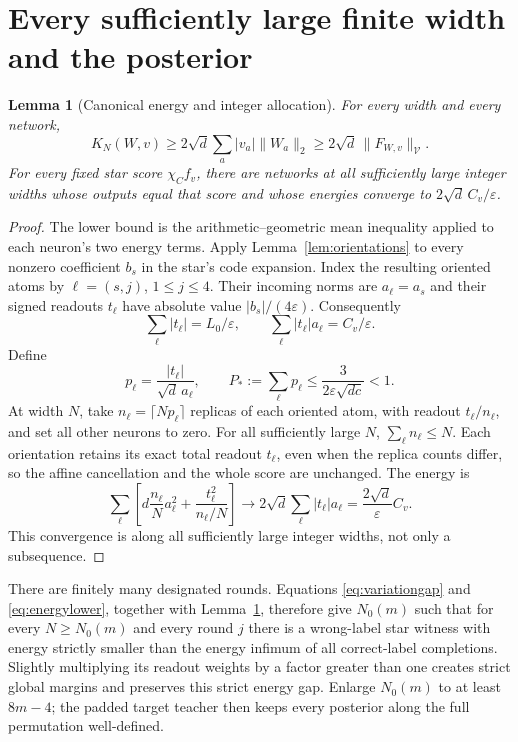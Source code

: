 \documentclass[11pt]{article}
\newtheorem{lemma}[theorem]{Lemma}
\newcommand{\cV}{\mathcal V}
\newcommand{\eps}{\varepsilon}
\begin{document}
\section{Every sufficiently large finite width and the posterior}

\begin{lemma}[Canonical energy and integer allocation]\label{lem:allocation}
For every width and every network,
\begin{equation}\label{eq:energylower}
 K_N(W,v)\ge2\sqrt d\sum_a |v_a|\|W_a\|_2
            \ge2\sqrt d\,\|F_{W,v}\|_{\cV}.
\end{equation}
For every fixed star score $\chi_C f_v$, there are networks at all
sufficiently large integer widths whose outputs equal that score and
whose energies converge to $2\sqrt d\,C_v/\eps$.
\end{lemma}
\begin{proof}
The lower bound is the arithmetic--geometric mean inequality applied
to each neuron's two energy terms. Apply Lemma~\ref{lem:orientations}
to every nonzero coefficient $b_s$ in the star's code expansion.
Index the resulting oriented atoms by $\ell=(s,j)$, $1\le j\le4$.
Their incoming norms are $a_\ell=a_s$ and their signed readouts
$t_\ell$ have absolute value $|b_s|/(4\eps)$. Consequently
\[
 \sum_\ell|t_\ell|=L_0/\eps,
 \qquad \sum_\ell|t_\ell|a_\ell=C_v/\eps.
\]
Define
\[
 p_\ell=\frac{|t_\ell|}{\sqrt d\,a_\ell},\qquad
 P_*:=\sum_\ell p_\ell\le\frac{3}{2\eps\sqrt{dc}}<1.
\]
At width $N$, take $n_\ell=\lceil Np_\ell\rceil$ replicas of each
oriented atom, with readout $t_\ell/n_\ell$, and set all other neurons
to zero. For all sufficiently large $N$, $\sum_\ell n_\ell\le N$.
Each orientation retains its exact total readout $t_\ell$, even when
the replica counts differ, so the affine cancellation and the whole
score are unchanged. The energy is
\[
 \sum_\ell\left[d\frac{n_\ell}{N}a_\ell^2
                   +\frac{t_\ell^2}{n_\ell/N}\right]
 \longrightarrow2\sqrt d\sum_\ell|t_\ell|a_\ell
       =\frac{2\sqrt d}{\eps}C_v.
\]
This convergence is along all sufficiently large integer widths, not
only a subsequence.
\end{proof}

There are finitely many designated rounds. Equations
\eqref{eq:variationgap} and \eqref{eq:energylower}, together with
Lemma~\ref{lem:allocation}, therefore give $N_0(m)$ such that for
every $N\ge N_0(m)$ and every round $j$ there is a wrong-label star
witness with energy strictly smaller than the energy infimum of all
correct-label completions. Slightly multiplying its readout weights
by a factor greater than one creates strict global margins and
preserves this strict energy gap.
Enlarge $N_0(m)$ to at least $8m-4$; the padded target teacher then
keeps every posterior along the full permutation well-defined.
\end{document}
